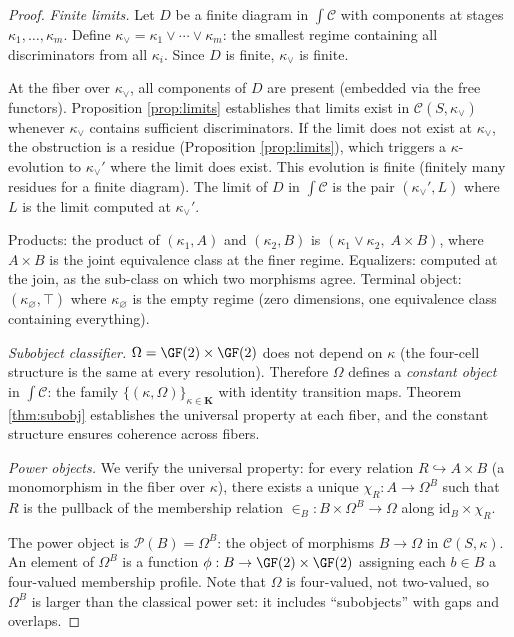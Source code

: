 \begin{proof}
\emph{Finite limits.}
Let $D$ be a finite diagram in $\int \mathcal{C}$ with
components at stages $\kappa_1, \ldots, \kappa_m$. Define
$\kappa_\vee = \kappa_1 \vee \cdots \vee \kappa_m$: the
smallest regime containing all discriminators from all
$\kappa_i$. Since $D$ is finite, $\kappa_\vee$ is finite.

At the fiber over $\kappa_\vee$, all components of $D$
are present (embedded via the free functors). Proposition
\ref{prop:limits} establishes that limits exist in
$\mathcal{C}(S,\kappa_\vee)$ whenever $\kappa_\vee$
contains sufficient discriminators. If the limit does not
exist at $\kappa_\vee$, the obstruction is a residue
(Proposition \ref{prop:limits}), which triggers a
$\kappa$-evolution to $\kappa_\vee'$ where the limit does
exist. This evolution is finite (finitely many residues
for a finite diagram). The limit of $D$ in
$\int \mathcal{C}$ is the pair $(\kappa_\vee', L)$ where
$L$ is the limit computed at $\kappa_\vee'$.

Products: the product of $(\kappa_1, A)$ and
$(\kappa_2, B)$ is $(\kappa_1 \vee \kappa_2,\; A \times B)$,
where $A \times B$ is the joint equivalence class at the
finer regime. Equalizers: computed at the join, as the
sub-class on which two morphisms agree. Terminal object:
$(\kappa_\varnothing, \top)$ where $\kappa_\varnothing$
is the empty regime (zero dimensions, one equivalence
class containing everything).

\emph{Subobject classifier.}
$\Omega = \GF(2) \times \GF(2)$ does not depend on
$\kappa$ (the four-cell structure is the same at every
resolution). Therefore $\Omega$ defines a \emph{constant
object} in $\int \mathcal{C}$: the family
$\{(\kappa, \Omega)\}_{\kappa \in \mathbf{K}}$ with
identity transition maps. Theorem \ref{thm:subobj}
establishes the universal property at each fiber, and
the constant structure ensures coherence across fibers.

\emph{Power objects.}
We verify the universal property: for every relation
$R \hookrightarrow A \times B$ (a monomorphism in the
fiber over $\kappa$), there exists a unique
$\chi_R: A \to \Omega^B$ such that $R$ is the pullback
of the membership relation
$\in_B: B \times \Omega^B \to \Omega$ along
$\mathrm{id}_B \times \chi_R$.

The power object is $\mathcal{P}(B) = \Omega^B$: the
object of morphisms $B \to \Omega$ in
$\mathcal{C}(S,\kappa)$. An element of $\Omega^B$ is a
function $\phi: B \to \GF(2) \times \GF(2)$ assigning
each $b \in B$ a four-valued membership profile. Note
that $\Omega$ is four-valued, not two-valued, so
$\Omega^B$ is larger than the classical power set: it
includes ``subobjects'' with gaps and overlaps.


\end{proof}
